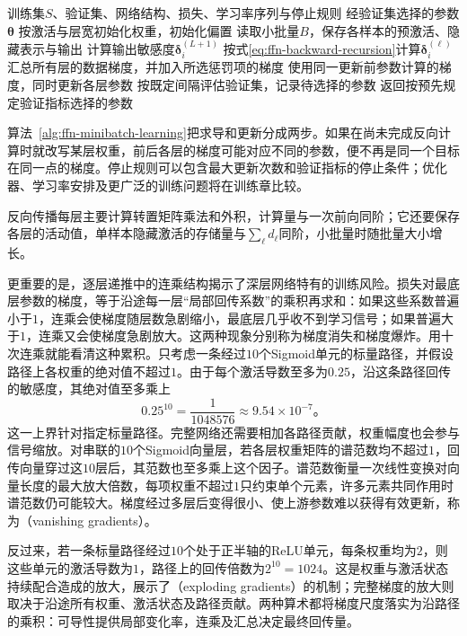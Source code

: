 \begin{algorithm}[前馈网络的小批量梯度学习]
  \label{alg:ffn-minibatch-learning}
  \begin{algorithmic}[1]
    \Require 训练集$S$、验证集、网络结构、损失、学习率序列与停止规则
    \Ensure 经验证集选择的参数$\bm{\theta}$
    \State 按激活与层宽初始化权重，初始化偏置
      \State 读取小批量$B$，保存各样本的预激活、隐藏表示与输出
      \State 计算输出敏感度$\bm{\delta}_i^{(L+1)}$
        \State 按式\eqref{eq:ffn-backward-recursion}计算$\bm{\delta}_i^{(\ell)}$
      \EndFor
      \State 汇总所有层的数据梯度，并加入所选惩罚项的梯度
      \State 使用同一更新前参数计算的梯度，同时更新各层参数
      \State 按既定间隔评估验证集，记录待选择的参数
    \EndWhile
    \State 返回按预先规定验证指标选择的参数
  \end{algorithmic}
\end{algorithm}

算法~\ref{alg:ffn-minibatch-learning}把求导和更新分成两步。如果在尚未完成反向计算时就改写某层权重，前后各层的梯度可能对应不同的参数，便不再是同一个目标在同一点的梯度。停止规则可以包含最大更新次数和验证指标的停止条件；优化器、学习率安排及更广泛的训练问题将在训练章比较。

反向传播每层主要计算转置矩阵乘法和外积，计算量与一次前向同阶；它还要保存各层的活动值，单样本隐藏激活的存储量与$\sum_\ell d_\ell$同阶，小批量时随批量大小增长。

更重要的是，逐层递推中的连乘结构揭示了深层网络特有的训练风险。损失对最底层参数的梯度，等于沿途每一层“局部回传系数”的乘积再求和：如果这些系数普遍小于$1$，连乘会使梯度随层数急剧缩小，最底层几乎收不到学习信号；如果普遍大于$1$，连乘又会使梯度急剧放大。这两种现象分别称为梯度消失和梯度爆炸。用十次连乘就能看清这种累积。只考虑一条经过$10$个Sigmoid单元的标量路径，并假设路径上各权重的绝对值不超过$1$。由于每个激活导数至多为$0.25$，沿这条路径回传的敏感度，其绝对值至多乘上
\[
  0.25^{10}=\frac{1}{1048576}\approx9.54\times10^{-7}\text{。}
\]
这一上界针对指定标量路径。完整网络还需要相加各路径贡献，权重幅度也会参与信号缩放。对串联的$10$个Sigmoid向量层，若各层权重矩阵的谱范数均不超过$1$，回传向量穿过这$10$层后，其范数也至多乘上这个因子。谱范数衡量一次线性变换对向量长度的最大放大倍数，每项权重不超过$1$只约束单个元素，许多元素共同作用时谱范数仍可能较大。梯度经过多层后变得很小、使上游参数难以获得有效更新，称为（vanishing gradients）。

反过来，若一条标量路径经过$10$个处于正半轴的ReLU单元，每条权重均为$2$，则这些单元的激活导数为$1$，路径上的回传倍数为$2^{10}=1024$。这是权重与激活状态持续配合造成的放大，展示了（exploding gradients）的机制；完整梯度的放大则取决于沿途所有权重、激活状态及路径贡献。两种算术都将梯度尺度落实为沿路径的乘积：可导性提供局部变化率，连乘及汇总决定最终回传量。

